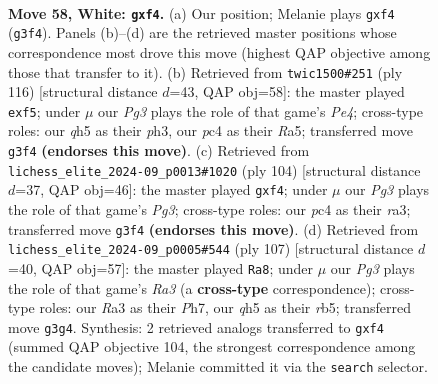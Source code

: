 \documentclass[11pt]{article}
\begin{document}
\clearpage

\begin{figure}[p]\centering
\begin{subfigure}{0.46\textwidth}\centering
\resizebox{\linewidth}{!}{%
\newchessgame
\chessboard[
  setfen={8/p5k1/1p6/7q/P1p2p2/RP1n2P1/6K1/8 w - - 0 58},
  showmover=false,
  pgfstyle=straightmove, color=movearrow, markmove={g3-f4}
]}
\caption{}
\end{subfigure}\hfill
\begin{subfigure}{0.46\textwidth}\centering
\resizebox{\linewidth}{!}{%
\newchessgame
\chessboard[
  setfen={4r3/8/8/R3npk1/4P3/1P3P1p/P6K/8 w - - 1 59},
  showmover=false,
  pgfstyle=straightmove, color=movearrow, markmove={e4-f5}
]}
\caption{}
\end{subfigure}
\\[4pt]
\begin{subfigure}{0.46\textwidth}\centering
\resizebox{\linewidth}{!}{%
\newchessgame
\chessboard[
  setfen={8/PR6/5kp1/7p/5p1P/r5P1/5K2/8 w - - 0 53},
  showmover=false,
  pgfstyle=straightmove, color=movearrow, markmove={g3-f4}
]}
\caption{}
\end{subfigure}\hfill
\begin{subfigure}{0.46\textwidth}\centering
\resizebox{\linewidth}{!}{%
\newchessgame
\chessboard[
  setfen={8/2k4p/r5p1/PR3p1P/2K2P2/6P1/8/8 b - - 0 54},
  showmover=false,
  pgfstyle=straightmove, color=movearrow, markmove={a6-a8}
]}
\caption{}
\end{subfigure}
\caption{\textbf{Move 58, White: \texttt{gxf4}.} (a) Our position; Melanie plays \texttt{gxf4} (\texttt{g3f4}). Panels (b)--(d) are the retrieved master positions whose correspondence most drove this move (highest QAP objective among those that transfer to it). (b) Retrieved from \texttt{twic1500\#251} (ply 116) [structural distance $d$=43, QAP obj=58]: the master played \texttt{exf5}; under $\mu$ our \emph{Pg3} plays the role of that game's \emph{Pe4}; cross-type roles: our \emph{q}h5 as their \emph{p}h3, our \emph{p}c4 as their \emph{R}a5; transferred move \texttt{g3f4} \textbf{(endorses this move)}. (c) Retrieved from \texttt{lichess\_elite\_2024-09\_p0013\#1020} (ply 104) [structural distance $d$=37, QAP obj=46]: the master played \texttt{gxf4}; under $\mu$ our \emph{Pg3} plays the role of that game's \emph{Pg3}; cross-type roles: our \emph{p}c4 as their \emph{r}a3; transferred move \texttt{g3f4} \textbf{(endorses this move)}. (d) Retrieved from \texttt{lichess\_elite\_2024-09\_p0005\#544} (ply 107) [structural distance $d$=40, QAP obj=57]: the master played \texttt{Ra8}; under $\mu$ our \emph{Pg3} plays the role of that game's \emph{Ra3} (a \textbf{cross-type} correspondence); cross-type roles: our \emph{R}a3 as their \emph{P}h7, our \emph{q}h5 as their \emph{r}b5; transferred move \texttt{g3g4}. Synthesis: 2 retrieved analogs transferred to \texttt{gxf4} (summed QAP objective 104, the strongest correspondence among the candidate moves); Melanie committed it via the \texttt{search} selector.}
\label{fig:thought-m114}
\end{figure}
\end{document}
